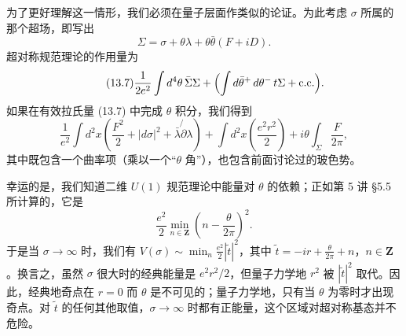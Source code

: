 为了更好理解这一情形，我们必须在量子层面作类似的论证。为此考虑 $\sigma$ 所属的那个超场，即写出
\[
  \Sigma=\sigma+\theta\lambda+\theta\bar\theta(F+iD).
\]
超对称规范理论的作用量为
\begin{equation}
  \tag{13.7}
  \label{eq:13-7}
  \frac{1}{2e^{2}}\int d^{4}\theta\,\bar\Sigma\Sigma
  +\Bigl(\int d\bar\theta^{+}\,d\theta^{-}\,t\Sigma+\text{c.c.}\Bigr).
\end{equation}
如果在有效拉氏量 (13.7) 中完成 $\theta$ 积分，我们得到
\[
  \frac{1}{e^{2}}\int d^{2}x\left(\frac{F^{2}}{2}+|d\sigma|^{2}+\bar\lambda\not{\partial}\lambda\right)
  +\int d^{2}x\left(\frac{e^{2}r^{2}}{2}\right)
  +i\theta\int_{\Sigma}\frac{F}{2\pi},
\]
其中既包含一个曲率项（乘以一个“$\theta$ 角”），也包含前面讨论过的玻色势。


幸运的是，我们知道二维 $U(1)$ 规范理论中能量对 $\theta$ 的依赖；正如第 5 讲 §5.5 所计算的，它是
\[
  \frac{e^{2}}{2}\min_{n\in\mathbf{Z}}\left(n-\frac{\theta}{2\pi}\right)^{2}.
\]
于是当 $\sigma\to\infty$ 时，我们有 $V(\sigma)\sim\min_{n}\frac{e^{2}}{2}|\tilde t|^{2}$，其中 $\tilde t=-ir+\frac{\theta}{2\pi}+n$，$n\in\mathbf{Z}$。换言之，虽然 $\sigma$ 很大时的经典能量是 $e^{2}r^{2}/2$，但量子力学地 $r^{2}$ 被 $|\tilde t|^{2}$ 取代。因此，经典地奇点在 $r=0$ 而 $\theta$ 是不可见的；量子力学地，只有当 $\theta$ 为零时才出现奇点。对 $\tilde t$ 的任何其他取值，$\sigma\to\infty$ 时都有正能量，这个区域对超对称基态并不危险。



